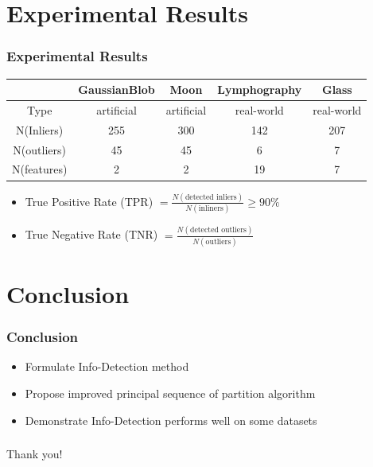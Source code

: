 \documentclass[notheorems]{beamer}
\begin{document}
\section{Experimental Results}
\begin{frame}
	\frametitle{Experimental Results}
\begin{table}
\centering
\begin{tabular}{ccccc}
\hline
              &  GaussianBlob   &      Moon       &  Lymphography  &     Glass     \\
\hline
   Type    & artificial & artificial & real-world & real-world \\
   N(Inliers) & 255  & 300 & 142  & 207 \\
   N(outliers)   & 45 &  45  & 6 & 7 \\
   N(features)   & 2 &  2  & 19 & 7  \\
\hline
\end{tabular}
\end{table}
\begin{itemize}
\item True Positive Rate (TPR)  $=\frac{N(\textrm{detected inliers})}{N(\textrm{inliners})} \geq 90\% $
\item True Negative Rate (TNR) $=\frac{N(\textrm{detected outliers})}{N(\textrm{outliers})}$
\end{itemize}

\end{frame}	
\section{Conclusion}
\begin{frame}
\frametitle{Conclusion}
\begin{itemize}
\item Formulate Info-Detection method
\item Propose improved principal sequence of partition algorithm 
\item Demonstrate Info-Detection performs well on some datasets
\end{itemize}
\end{frame}
%
%
\begin{frame}
\frametitle{}
\begin{block}{}
\centering
Thank you!
\end{block}
\end{frame}
\end{document}

